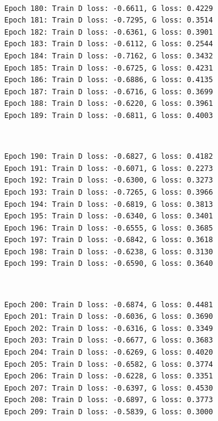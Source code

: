 \documentclass[11pt]{article}
\begin{document}
    \begin{center}
    \end{center}
    { \hspace*{\fill} \\}
    
    \begin{Verbatim}[commandchars=\\\{\}]
Epoch 180: Train D loss: -0.6611, G loss: 0.4229
Epoch 181: Train D loss: -0.7295, G loss: 0.3514
Epoch 182: Train D loss: -0.6361, G loss: 0.3901
Epoch 183: Train D loss: -0.6112, G loss: 0.2544
Epoch 184: Train D loss: -0.7162, G loss: 0.3432
Epoch 185: Train D loss: -0.6725, G loss: 0.4231
Epoch 186: Train D loss: -0.6886, G loss: 0.4135
Epoch 187: Train D loss: -0.6716, G loss: 0.3699
Epoch 188: Train D loss: -0.6220, G loss: 0.3961
Epoch 189: Train D loss: -0.6811, G loss: 0.4003

    \end{Verbatim}

    \begin{center}
    \end{center}
    { \hspace*{\fill} \\}
    
    \begin{Verbatim}[commandchars=\\\{\}]
Epoch 190: Train D loss: -0.6827, G loss: 0.4182
Epoch 191: Train D loss: -0.6071, G loss: 0.2273
Epoch 192: Train D loss: -0.6300, G loss: 0.3273
Epoch 193: Train D loss: -0.7265, G loss: 0.3966
Epoch 194: Train D loss: -0.6819, G loss: 0.3813
Epoch 195: Train D loss: -0.6340, G loss: 0.3401
Epoch 196: Train D loss: -0.6555, G loss: 0.3685
Epoch 197: Train D loss: -0.6842, G loss: 0.3618
Epoch 198: Train D loss: -0.6238, G loss: 0.3130
Epoch 199: Train D loss: -0.6590, G loss: 0.3640

    \end{Verbatim}

    \begin{center}
    \end{center}
    { \hspace*{\fill} \\}
    
    \begin{Verbatim}[commandchars=\\\{\}]
Epoch 200: Train D loss: -0.6874, G loss: 0.4481
Epoch 201: Train D loss: -0.6036, G loss: 0.3690
Epoch 202: Train D loss: -0.6316, G loss: 0.3349
Epoch 203: Train D loss: -0.6677, G loss: 0.3683
Epoch 204: Train D loss: -0.6269, G loss: 0.4020
Epoch 205: Train D loss: -0.6582, G loss: 0.3774
Epoch 206: Train D loss: -0.6228, G loss: 0.3351
Epoch 207: Train D loss: -0.6397, G loss: 0.4530
Epoch 208: Train D loss: -0.6897, G loss: 0.3773
Epoch 209: Train D loss: -0.5839, G loss: 0.3000

    \end{Verbatim}
\end{document}
